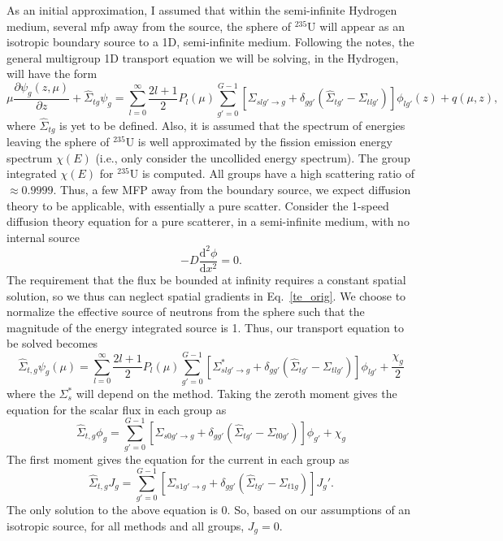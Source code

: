 \documentclass[12pt]{article}
\newcommand{\pderiv}[2]{\frac{\partial #1}{\partial #2}}
\renewcommand{\d}{\mathrm{d}}
\newcommand{\ra}{\rightarrow}
\newenvironment{solnum}[2][Solution]{\begin{trivlist}
\item[\hskip \labelsep {\bfseries #1}\hskip \labelsep {\bfseries #2:}]\hspace{0.3in}\newline\newline}{\end{trivlist}}
\newcommand{\iso}[2]{\ensuremath{^{#2}\text{#1}}}
\begin{document}
\begin{solnum}{2}
As an initial approximation, I assumed that within the semi-infinite Hydrogen medium, several
mfp away from the source, the sphere of \iso{U}{235} will appear as an isotropic
boundary source to a 1D, semi-infinite medium.  Following the notes, the general multigroup
1D transport equation we will be solving, in the Hydrogen, will have the form
\begin{equation}\label{te_orig}
    \mu\pderiv{\psi_g(z,\mu)}{z} +\hat\Sigma_{tg}\psi_g = \sum_{l=0}^\infty
    \frac{2l+1}{2} P_l(\mu) \sum_{g'=0}^{G-1}\left[\Sigma_{slg'\ra g} +
    \delta_{gg'}\left(\hat\Sigma_{tg'}-\Sigma_{tlg'}\right)\right]\phi_{lg'}(z) +
    q(\mu,z),
\end{equation}
where $\hat\Sigma_{tg}$ is yet to be defined.
Also, it is assumed that the spectrum of energies leaving the sphere of \iso{U}{235} is well
approximated by the fission emission energy spectrum $\chi(E)$ (i.e., only consider the
uncollided energy spectrum).  The group integrated $\chi(E)$ for \iso{U}{235} is
computed.  All groups have a high scattering ratio of $\approx0.9999$.  Thus, a
few MFP away from the boundary source, we expect diffusion theory to be applicable,
with essentially a pure scatter. Consider the 1-speed diffusion theory equation for a pure
scatterer, in a semi-infinite medium, with no internal source
\begin{equation}
    -D \frac{\d^2\phi}{\d x^2} = 0.
\end{equation}
The requirement that the flux be bounded at infinity requires a constant spatial
solution, so we thus can neglect spatial gradients in Eq.~\eqref{te_orig}.
We choose to normalize the effective source of neutrons from the sphere such that the
magnitude of the energy integrated source is 1.  Thus, our transport equation to be solved becomes
\begin{equation}
    \hat\Sigma_{t,g}\psi_g(\mu) = \sum_{l=0}^\infty
    \frac{2l+1}{2} P_l(\mu) \sum_{g'=0}^{G-1}\left[\Sigma^*_{slg'\ra g} +
    \delta_{gg'}\left(\hat\Sigma_{tg'}-\Sigma_{tlg'}\right)\right]\phi_{lg'} +
    \frac{\chi_g}{2}
\end{equation}
where the $\Sigma_s^*$ will depend on the method.
Taking the zeroth moment gives the equation for the scalar flux in each group as
\begin{equation}
    \hat\Sigma_{t,g}\phi_g = \sum_{g'=0}^{G-1}\left[\Sigma_{s0g'\ra g} +
    \delta_{gg'}\left(\hat\Sigma_{tg'}-\Sigma_{t0g'}\right)\right]\phi_{g'} +
    \chi_g
\end{equation}
The first moment gives the equation for the current in each group as
\begin{equation}
    \hat\Sigma_{t,g}J_g = \sum_{g'=0}^{G-1}\left[\Sigma_{s1g'\ra g} +
    \delta_{gg'}\left(\hat\Sigma_{tg'}-\Sigma_{t1g}\right)\right]J_g'.
\end{equation}
The only solution to the above equation is 0.  So, based on our assumptions of an
isotropic source, for all methods and all groups, $\boxed{J_g=0}$.


\end{solnum}
\end{document}
